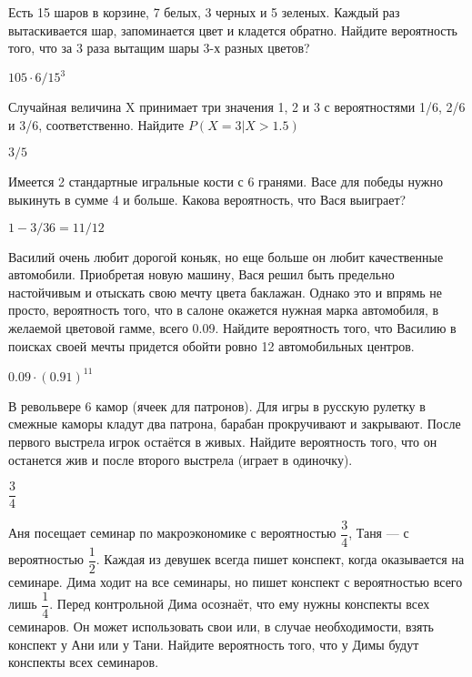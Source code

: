 \documentclass[12pt, addpoints, answers]{exam} %
\begin{document}
\begin{questions}
\question Есть 15 шаров в корзине, 7 белых, 3 черных и 5 зеленых. Каждый раз вытаскивается шар, запоминается цвет и кладется обратно. Найдите вероятность того, что за 3 раза вытащим шары 3-х разных цветов?

\begin{solution}
 $105\cdot6/15^3$
\end{solution}

\question Случайная величина X принимает три значения 1, 2 и 3 с вероятностями 1/6, 2/6 и 3/6, соответственно. Найдите $P(X=3|X>1.5)$


\begin{solution}
 $3/5$
\end{solution}

\question Имеется 2 стандартные игральные кости с 6 гранями. Васе для победы нужно выкинуть в сумме 4 и больше. Какова вероятность, что Вася выиграет?

\begin{solution}
 $1-3/36=11/12$
\end{solution}



\question Василий очень любит дорогой коньяк, но еще больше он любит качественные автомобили. Приобретая новую машину, Вася решил быть предельно настойчивым и отыскать свою мечту цвета баклажан. Однако это и впрямь не просто, вероятность того, что в салоне окажется нужная марка автомобиля, в желаемой цветовой гамме, всего 0.09. Найдите вероятность того, что Василию в поисках своей мечты придется обойти ровно 12 автомобильных центров.

\begin{solution}
 $0.09\cdot(0.91)^{11}$
\end{solution}

\question
В револьвере 6 камор (ячеек для патронов). Для игры в русскую рулетку в смежные каморы кладут два патрона, барабан прокручивают и закрывают. После первого выстрела игрок остаётся в живых. Найдите вероятность того, что он останется жив и после второго выстрела (играет в одиночку).
\begin{solution}
$\dfrac{3}{4}$
\end{solution}

\question
Аня посещает семинар по макроэкономике с вероятностью $\dfrac{3}{4}$, Таня --- с вероятностью $\dfrac{1}{2}$. Каждая из девушек всегда пишет конспект, когда оказывается на семинаре. Дима ходит на все семинары, но пишет конспект с вероятностью всего лишь $\dfrac{1}{4}$. Перед контрольной Дима осознаёт, что ему нужны конспекты всех семинаров. Он может использовать свои или, в случае необходимости, взять конспект у Ани или у Тани. Найдите вероятность того, что у Димы будут конспекты всех семинаров.


\end{questions}
\end{document}
